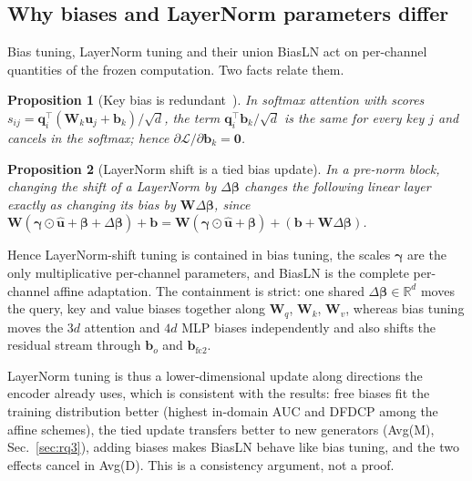 \documentclass[fonts]{icst}
\newtheorem{proposition}{Proposition}
\begin{document}
\subsection{Why biases and LayerNorm parameters differ}
\label{sec:analysis}
Bias tuning, LayerNorm tuning and their union BiasLN act on per-channel quantities of the frozen computation. Two facts relate them.

\begin{proposition}[Key bias is redundant~\cite{namazifar2023bias}]
\label{prop:key}
In softmax attention with scores $s_{ij}=\mathbf{q}_i^\top(\mathbf{W}_k\mathbf{u}_j+\mathbf{b}_k)/\sqrt{d}$, the term $\mathbf{q}_i^\top\mathbf{b}_k/\sqrt{d}$ is the same for every key $j$ and cancels in the softmax; hence $\partial\mathcal{L}/\partial\mathbf{b}_k=\mathbf{0}$.
\end{proposition}

\begin{proposition}[LayerNorm shift is a tied bias update]
\label{prop:fold}
In a pre-norm block, changing the shift of a LayerNorm by $\Delta\boldsymbol{\beta}$ changes the following linear layer exactly as changing its bias by $\mathbf{W}\Delta\boldsymbol{\beta}$, since $\mathbf{W}(\boldsymbol{\gamma}\odot\hat{\mathbf{u}}+\boldsymbol{\beta}+\Delta\boldsymbol{\beta})+\mathbf{b}=\mathbf{W}(\boldsymbol{\gamma}\odot\hat{\mathbf{u}}+\boldsymbol{\beta})+(\mathbf{b}+\mathbf{W}\Delta\boldsymbol{\beta})$.
\end{proposition}

Hence LayerNorm-shift tuning is contained in bias tuning, the scales $\boldsymbol{\gamma}$ are the only multiplicative per-channel parameters, and BiasLN is the complete per-channel affine adaptation. The containment is strict: one shared $\Delta\boldsymbol{\beta}\in\mathbb{R}^{d}$ moves the query, key and value biases together along $\mathbf{W}_q$, $\mathbf{W}_k$, $\mathbf{W}_v$, whereas bias tuning moves the $3d$ attention and $4d$ MLP biases independently and also shifts the residual stream through $\mathbf{b}_o$ and $\mathbf{b}_{\mathrm{fc2}}$.

LayerNorm tuning is thus a lower-dimensional update along directions the encoder already uses, which is consistent with the results: free biases fit the training distribution better (highest in-domain AUC and DFDCP among the affine schemes), the tied update transfers better to new generators (Avg(M), Sec.~\ref{sec:rq3}), adding biases makes BiasLN behave like bias tuning, and the two effects cancel in Avg(D). This is a consistency argument, not a proof.
\end{document}
